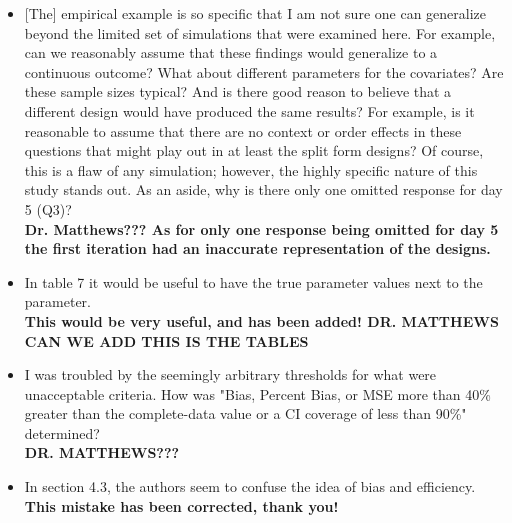 \documentclass[letterpaper,12pt]{article}\usepackage[]{graphicx}\usepackage[]{color}
\begin{document}
\begin{itemize}
{\bf We felt that as Sankhya B is an applied journal, some technical details could be omitted here. That said, this section has been rewritten with your comment in mind.}\\

\item {[The]} empirical example is so specific that I am not sure one can generalize beyond the limited set of simulations that were examined here.  For example, can we reasonably assume that these findings would generalize to a continuous outcome? What about different parameters for the covariates? Are these sample sizes typical? And is there good reason to believe that a different design would have produced the same results? For example, is it reasonable to assume that there are no context or order effects in these questions that might play out in at least the split form designs?  Of course, this is a flaw of any simulation; however, the highly specific nature of this study stands out. As an aside, why is there only one omitted response for day 5 (Q3)?\\

{\bf Dr. Matthews??? As for only one response being omitted for day 5 the first iteration had an inaccurate representation of the designs.}\\

\item In table 7 it would be useful to have the true parameter values next to the parameter.\\

{\bf This would be very useful, and has been added! DR. MATTHEWS CAN WE ADD THIS IS THE TABLES}\\

\item I was troubled by the seemingly arbitrary thresholds for what were unacceptable criteria. How was "Bias, Percent Bias, or MSE more than 40\% greater than the complete-data value or a CI coverage of less than 90\%" determined?\\

{\bf DR. MATTHEWS???}\\

\item In section 4.3, the authors seem to confuse the idea of bias and efficiency.\\

{\bf This mistake has been corrected, thank you!}\\
\end{itemize}
\end{document}
